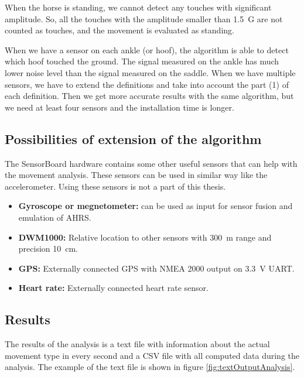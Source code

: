 When the horse is standing, we cannot detect any touches with significant amplitude. So, all the touches with the amplitude smaller than \SI{1.5}{G} are not counted as touches, and the movement is evaluated as standing.

When we have a sensor on each ankle (or hoof), the algorithm is able to detect which hoof touched the ground. The signal measured on the ankle has much lower noise level than the signal measured on the saddle. When we have multiple sensors, we have to extend the definitions and take into account the part (1) of each definition. Then we get more accurate results with the same algorithm, but we need at least four sensors and the installation time is longer.

\subsection{Possibilities of extension of the algorithm}
The SensorBoard hardware contains some other useful sensors that can help with the movement analysis. These sensors can be used in  similar way like the accelerometer. Using these sensors is not a part of this thesis.
\begin{itemize}
    \item \textbf{Gyroscope or megnetometer:} can be used as input for sensor fusion and emulation of \ac{AHRS}.
    \item \textbf{DWM1000:} Relative location to other sensors with \SI{300}{m} range and precision \SI{10}{cm}.
    \item \textbf{GPS:} Externally connected GPS with NMEA 2000 output on \SI{3.3}{V} \ac{UART}.
    \item \textbf{Heart rate:} Externally connected heart rate sensor.
\end{itemize}

\subsection{Results}
The results of the analysis is a text file with information about the actual movement type in every second and a \ac{CSV} file with all computed data during the analysis. The example of the text file is shown in figure \ref{fig:textOutputAnalysis}.

